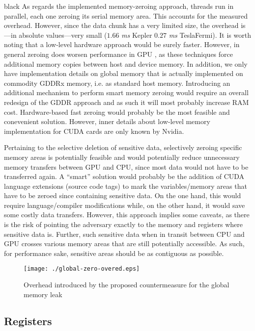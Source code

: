 \documentclass[11pt,onecolumn,letterpaper]{IEEEtran}
\newcommand{\clr}{black}
\begin{document}
\begin{color}{\clr}
\label{zeroing}
As regards the implemented memory-zeroing approach, threads run in parallel, each one zeroing its serial memory area. 
This accounts for the measured overhead. However, since the data chunk has a very limited size, the overhead is---in absolute values---very small
($1.66$ \emph{ms} Kepler $0.27$ \emph{ms} TeslaFermi). 
It is worth noting that a low-level hardware approach would be surely faster.
However, in general zeroing does worsen performance in GPU \cite{zeroingoverhead}, 
as these techniques force additional memory copies between host and device memory.
In addition, we only have implementation details on global memory that is actually implemented on commodity GDDRx memory, i.e. as standard host memory.
Introducing an additional mechanism to perform smart memory zeroing would require an overall redesign of the GDDR approach and as such it will most probably increase RAM cost. 
Hardware-based fast zeroing would probably be the most feasible and conevenient solution.
However, inner details about low-level memory implementation for CUDA cards are only known by Nvidia.

Pertaining to the selective deletion of sensitive data, selectively zeroing specific memory areas is potentially feasible
and would potentially reduce unnecessary memory transfers between GPU and CPU,
since most data would not have to be transferred again.
A ``smart'' solution would probably be the addition of CUDA language extensions (source code tags) 
to mark the variables/memory areas that have to be zeroed since containing sensitive data.
On the one hand, this would require language/compiler modifications while, on the other hand, it would save some costly data transfers. 
However, this approach implies some caveats,
as there is the risk of pointing the adversary exactly to the memory and registers where sensitive data is.
Further, such sensitive data when in transit between CPU and GPU crosses various memory areas that are still potentially accessible.
As such, for performance sake, sensitive areas should be as contiguous as possible.
\end{color}


\begin{figure}
	\centering
	\texttt{[image: ./global-zero-overed.eps]}
	\caption{Overhead introduced by the proposed countermeasure for the global memory leak}
	\label{fig:gbl-zero}
\end{figure}

\subsection{Registers}
\end{document}
